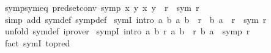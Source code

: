\begin{isabellebody}
\isanewline
{}\isamarkupfalse%
\ symp{\isacharunderscore}{\kern0pt}sym{\isacharunderscore}{\kern0pt}eq\ {\isacharbrackleft}{\kern0pt}pred{\isacharunderscore}{\kern0pt}set{\isacharunderscore}{\kern0pt}conv{\isacharbrackright}{\kern0pt}{\isacharcolon}{\kern0pt}\ {\isachardoublequoteopen}symp\ {\isacharparenleft}{\kern0pt}{\isasymlambda}x\ y{\isachardot}{\kern0pt}\ {\isacharparenleft}{\kern0pt}x{\isacharcomma}{\kern0pt}\ y{\isacharparenright}{\kern0pt}\ {\isasymin}\ r{\isacharparenright}{\kern0pt}\ {\isasymlongleftrightarrow}\ sym\ r{\isachardoublequoteclose}\isanewline
%
\isadelimproof
\ \ %
\endisadelimproof
%
\isatagproof
{}\isamarkupfalse%
\ {\isacharparenleft}{\kern0pt}simp\ add{\isacharcolon}{\kern0pt}\ sym{\isacharunderscore}{\kern0pt}def\ symp{\isacharunderscore}{\kern0pt}def{\isacharparenright}{\kern0pt}%
\endisatagproof
{\isafoldproof}%
%
\isadelimproof
\isanewline
%
\endisadelimproof
\isanewline
{}\isamarkupfalse%
\ symI\ {\isacharbrackleft}{\kern0pt}intro{\isacharquery}{\kern0pt}{\isacharbrackright}{\kern0pt}{\isacharcolon}{\kern0pt}\ {\isachardoublequoteopen}{\isacharparenleft}{\kern0pt}{\isasymAnd}a\ b{\isachardot}{\kern0pt}\ {\isacharparenleft}{\kern0pt}a{\isacharcomma}{\kern0pt}\ b{\isacharparenright}{\kern0pt}\ {\isasymin}\ r\ {\isasymLongrightarrow}\ {\isacharparenleft}{\kern0pt}b{\isacharcomma}{\kern0pt}\ a{\isacharparenright}{\kern0pt}\ {\isasymin}\ r{\isacharparenright}{\kern0pt}\ {\isasymLongrightarrow}\ sym\ r{\isachardoublequoteclose}\isanewline
%
\isadelimproof
\ \ %
\endisadelimproof
%
\isatagproof
{}\isamarkupfalse%
\ {\isacharparenleft}{\kern0pt}unfold\ sym{\isacharunderscore}{\kern0pt}def{\isacharparenright}{\kern0pt}\ iprover%
\endisatagproof
{\isafoldproof}%
%
\isadelimproof
\isanewline
%
\endisadelimproof
\isanewline
{}\isamarkupfalse%
\ sympI\ {\isacharbrackleft}{\kern0pt}intro{\isacharquery}{\kern0pt}{\isacharbrackright}{\kern0pt}{\isacharcolon}{\kern0pt}\ {\isachardoublequoteopen}{\isacharparenleft}{\kern0pt}{\isasymAnd}a\ b{\isachardot}{\kern0pt}\ r\ a\ b\ {\isasymLongrightarrow}\ r\ b\ a{\isacharparenright}{\kern0pt}\ {\isasymLongrightarrow}\ symp\ r{\isachardoublequoteclose}\isanewline
%
\isadelimproof
\ \ %
\endisadelimproof
%
\isatagproof
{}\isamarkupfalse%
\ {\isacharparenleft}{\kern0pt}fact\ symI\ {\isacharbrackleft}{\kern0pt}to{\isacharunderscore}{\kern0pt}pred{\isacharbrackright}{\kern0pt}{\isacharparenright}{\kern0pt}%
\endisatagproof
{\isafoldproof}%
%
\isadelimproof
\isanewline
%
\endisadelimproof
\isanewline
{}\isamarkupfalse%

\end{isabellebody}
